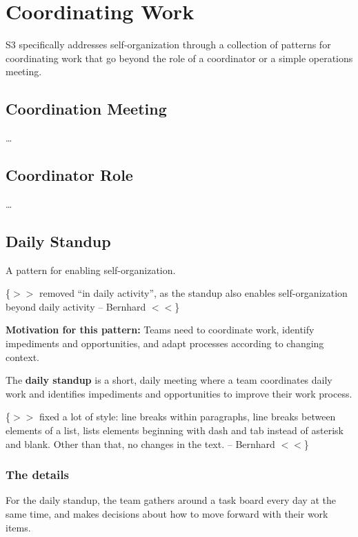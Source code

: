 \chapter{Coordinating Work}
\label{coordinatingwork}

S3 specifically addresses self-organization through a collection of patterns for coordinating work that go beyond the role of a coordinator or a simple operations meeting.

\section{Coordination Meeting}
\label{coordinationmeeting}

{\ldots}

\section{Coordinator Role}
\label{coordinatorrole}

{\ldots}

\section{Daily Standup}
\label{dailystandup}

A pattern for enabling self-organization.

\{$>$$>$ removed ``in daily activity'', as the standup also enables self-organization beyond daily activity -- Bernhard $<$$<$\}

\textbf{Motivation for this pattern:} Teams need to coordinate work, identify impediments and opportunities, and adapt processes according to changing context.

The \textbf{daily standup} is a short, daily meeting where a team coordinates daily work and identifies impediments and opportunities to improve their work process.

\{$>$$>$ fixed a lot of style: line breaks within paragraphs, line breaks between elements of a list, lists elements beginning with dash and tab instead of asterisk and blank. Other than that, no changes in the text. -- Bernhard $<$$<$\}

\subsection{The details}
\label{thedetails}

For the daily standup, the team gathers around a task board every day at the same time, and makes decisions about how to move forward with their work items.

